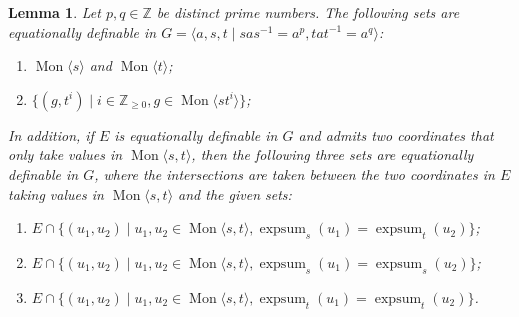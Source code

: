 \documentclass[11pt]{amsart}
\newtheorem{lem}[theorem]{Lemma}
\theoremstyle{definition}
\numberwithin{theorem}{section}
\DeclareMathOperator{\Mon}{Mon}
\DeclareMathOperator{\expsum}{expsum}
\newcommand{\Z}{\mathbb{Z}}
\begin{document}
	\begin{lem}
		\label{GBS-defable}
		Let \(p, q \in \mathbb{Z}\) be distinct prime numbers.
		The following sets are equationally definable in
		\(G = \langle a, s, t \mid sas^{-1} = a^p, tat^{-1} = a^q \rangle\):
		\begin{enumerate}
				\item \(\Mon\langle s \rangle\) and \(\Mon\langle t \rangle\);
						\label{GBS-defable-monst}
				\item \(\{(g, t^i) \mid  i \in \Z_{\geq 0}, g \in \Mon\langle st^i
						\rangle\}\); 
						\label{GBS-defable-g-ti}
		\end{enumerate}
		In addition, if \(E\) is equationally definable
				in \(G\) and admits two coordinates that only take values in
				\(\Mon\langle s, t \rangle\), then the following three sets
				are equationally definable in \(G\), where the intersections
				are taken between the two coordinates in \(E\) taking
				values in \(\Mon \langle s, t \rangle\) and the given sets:
		\begin{enumerate}[resume]
				\item \(E \cap \{(u_1, u_2) \mid u_1, u_2 \in \Mon\langle s, t \rangle,
						\expsum_{s}(u_1) = \expsum_t(u_2)\}\); 
						\label{GBS-defable-expsum-s-t}
				\item \(E \cap \{(u_1, u_2) \mid u_1, u_2 \in \Mon\langle s, t \rangle,
						\expsum_{s}(u_1) = \expsum_s(u_2)\}\); 
						\label{GBS-defable-expsum-s-s}
				\item \(E \cap \{(u_1, u_2) \mid u_1, u_2 \in \Mon\langle s, t \rangle,
				\expsum_{t}(u_1) = \expsum_t(u_2)\}\). 
						\label{GBS-defable-expsum-t-t}
		\end{enumerate}
	\end{lem}
\end{document}
